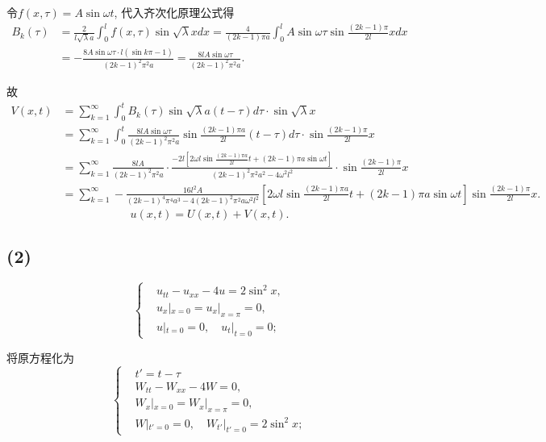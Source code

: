 \documentclass[11pt,a4paper]{article}
\begin{document}
令$f(x,\tau)=A\sin\omega t$, 代入齐次化原理公式得
\begin{align*}
  B_k(\tau)
   & =\frac{2}{l\sqrt{\lambda}a}\int_0^lf(x,\tau)\sin\sqrt{\lambda}xdx=\frac{4}{(2k-1)\pi a}\int_0^lA\sin\omega \tau\sin\frac{(2k-1)\pi}{2l}xdx \\
   & =-\frac{8A\sin\omega \tau\cdot l(\sin k\pi -1)}{(2k-1)^2\pi^2a}=\frac{8lA\sin\omega \tau}{(2k-1)^2\pi^2a}.
\end{align*}

故
\begin{align*}
  V(x,t) & =\sum_{k=1}^\infty\int_0^t B_k(\tau)\sin\sqrt{\lambda}a(t-\tau)d\tau\cdot\sin\sqrt{\lambda}x                                                                                            \\
         & =\sum_{k=1}^\infty\int_0^t \frac{8lA\sin\omega \tau}{(2k-1)^2\pi^2a}\sin\frac{(2k-1)\pi a}{2l}(t-\tau)d\tau\cdot\sin\frac{(2k-1)\pi}{2l}x                                               \\
         & =\sum_{k=1}^\infty\frac{8lA}{(2k-1)^2\pi^2a}\cdot\frac{-2l[2\omega l\sin\frac{(2k-1)\pi a}{2l}t+(2k-1)\pi a\sin\omega t]}{(2k-1)^2\pi^2 a^2-4\omega^2l^2}\cdot\sin\frac{(2k-1)\pi}{2l}x \\
         & =\sum_{k=1}^\infty-\frac{16l^2A}{(2k-1)^4\pi^4a^3-4(2k-1)^2\pi^2a\omega^2l^2}\left[2\omega l\sin\frac{(2k-1)\pi a}{2l}t+(2k-1)\pi a\sin\omega t\right]\sin\frac{(2k-1)\pi}{2l}x.
\end{align*}
$$u(x,t)=U(x,t)+V(x,t).$$

\subsection*{(2)}

$$
  \left\{\begin{aligned}
     & u_{tt}-u_{xx}-4u=2\sin^2x,     \\
     & u_x|_{x=0}=u_x|_{x=\pi}=0,     \\
     & u|_{t=0}=0,\quad u_t|_{t=0}=0;
  \end{aligned}\right.
$$

将原方程化为
$$
  \left\{\begin{aligned}
     & t'=t-\tau                                  \\
     & W_{tt}-W_{xx}-4W=0,                        \\
     & W_x|_{x=0}=W_x|_{x=\pi}=0,                 \\
     & W|_{t'=0}=0,\quad W_{t'}|_{t'=0}=2\sin^2x;
  \end{aligned}\right.
$$
\end{document}
